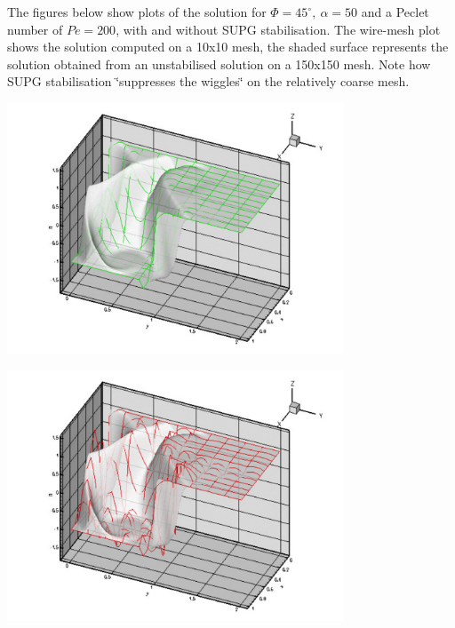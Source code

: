 The figures below show plots of the solution for $\Phi=45^\circ, \ \alpha=50 $ and a Peclet number of $ Pe = 200$, with and without S\+U\+PG stabilisation. The wire-\/mesh plot shows the solution computed on a 10x10 mesh, the shaded surface represents the solution obtained from an unstabilised solution on a 150x150 mesh. Note how S\+U\+PG stabilisation \char`\"{}suppresses the wiggles\char`\"{} on the relatively coarse mesh.

 
\begin{DoxyImage}
\includegraphics[width=0.75\textwidth]{stab}
\end{DoxyImage}


 
\begin{DoxyImage}
\includegraphics[width=0.75\textwidth]{unstab}
\end{DoxyImage}




